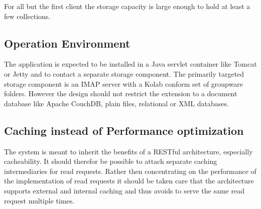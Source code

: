 \documentclass[11pt,a4paper,headsepline,twoside]{scrartcl}		%
\begin{document}
For all but the first client the storage capacity is large enough to hold at
least a few collections.

\subsection{Operation Environment}

The application is expected to be installed in a Java servlet container like
Tomcat or Jetty and to contact a separate storage component. The primarily
targeted storage component is an IMAP server with a Kolab conform set of
groupware folders. However the design should not restrict the extension to a
document database like Apache CouchDB, plain files, relational or XML databases.





\subsection{Caching instead of Performance optimization}
The system is meant to inherit the benefits of a RESTful architecture,
especially cacheability. It should therefor be possible to attach separate
caching intermediaries for read requests. Rather then concentrating on the
performance of the implementation of read requests it should be taken care that
the architecture supports external and internal caching and thus avoids to serve
the same read request multiple times.
\end{document}
